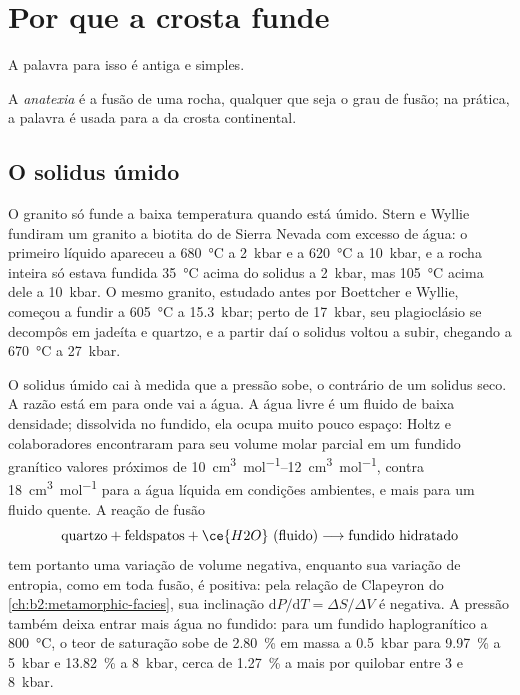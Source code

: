 \section{Por que a crosta funde}\label{sec:b2:crustal-melting:why}

A palavra para isso é antiga e simples.

\begin{definition}[Anatexia]\label{def:b2:crustal-melting:anatexis}
A \emph{anatexia} é a fusão de uma rocha, qualquer que seja o grau de fusão;
na prática, a palavra é usada para a  da crosta continental.
\end{definition}

\subsection*{O solidus úmido}

O granito só funde a baixa temperatura quando está úmido. Stern e Wyllie fundiram um granito
a biotita do  de Sierra Nevada com excesso de água: o primeiro líquido apareceu a
\qty{680}{\celsius} a \qty{2}{kbar} e a \qty{620}{\celsius} a \qty{10}{kbar}, e a
rocha inteira só estava fundida \qty{35}{\celsius} acima do solidus a \qty{2}{kbar}, mas
\qty{105}{\celsius} acima dele a \qty{10}{kbar}. O mesmo granito, estudado antes por
Boettcher e Wyllie, começou a fundir a \qty{605}{\celsius} a \qty{15.3}{kbar}; perto de
\qty{17}{kbar}, seu plagioclásio se decompôs em jadeíta e quartzo, e a partir daí o solidus
voltou a subir, chegando a \qty{670}{\celsius} a \qty{27}{kbar}.

O solidus úmido cai à medida que a pressão sobe, o contrário de um solidus seco. A razão está em para onde
vai a água. A água livre é um fluido de baixa densidade; dissolvida no fundido, ela ocupa muito
pouco espaço: Holtz e colaboradores encontraram para seu volume molar parcial em um fundido granítico valores próximos
de \qtyrange{10}{12}{\cubic\centi\metre\per\mole}, contra \qty{18}{\cubic\centi\metre\per\mole}
para a água líquida em condições ambientes, e mais para um fluido quente. A reação de fusão
\[\text{quartzo} + \text{feldspatos} + \ce{H2O}\ (\text{fluido}) \longrightarrow
\text{fundido hidratado}\]
tem portanto uma variação de volume negativa, enquanto sua variação de entropia, como em toda fusão, é
positiva: pela relação de Clapeyron do \cref{ch:b2:metamorphic-facies}, sua inclinação
$\mathrm{d}P/\mathrm{d}T = \Delta S/\Delta V$ é negativa. A pressão também deixa entrar mais água
no fundido: para um fundido haplogranítico a \qty{800}{\celsius}, o teor de saturação sobe
de \qty{2.80}{\percent} em massa a \qty{0.5}{kbar} para \qty{9.97}{\percent} a
\qty{5}{kbar} e \qty{13.82}{\percent} a \qty{8}{kbar}, cerca de \qty{1.27}{\percent} a mais
por quilobar entre 3 e \qty{8}{kbar}.

